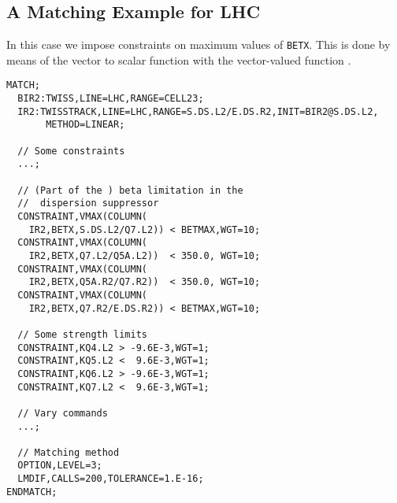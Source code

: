 \subsection{A Matching Example for LHC}
In this case we impose constraints on maximum values of \texttt{BETX}.
This is done by means of the vector to scalar function
 with the vector-valued function
.
\begin{verbatim}
MATCH;
  BIR2:TWISS,LINE=LHC,RANGE=CELL23;
  IR2:TWISSTRACK,LINE=LHC,RANGE=S.DS.L2/E.DS.R2,INIT=BIR2@S.DS.L2,
       METHOD=LINEAR;

  // Some constraints
  ...;

  // (Part of the ) beta limitation in the 
  //  dispersion suppressor
  CONSTRAINT,VMAX(COLUMN(
  	IR2,BETX,S.DS.L2/Q7.L2)) < BETMAX,WGT=10;
  CONSTRAINT,VMAX(COLUMN(
  	IR2,BETX,Q7.L2/Q5A.L2))  < 350.0, WGT=10;
  CONSTRAINT,VMAX(COLUMN(
  	IR2,BETX,Q5A.R2/Q7.R2))  < 350.0, WGT=10;
  CONSTRAINT,VMAX(COLUMN(
  	IR2,BETX,Q7.R2/E.DS.R2)) < BETMAX,WGT=10;

  // Some strength limits
  CONSTRAINT,KQ4.L2 > -9.6E-3,WGT=1;
  CONSTRAINT,KQ5.L2 <  9.6E-3,WGT=1;
  CONSTRAINT,KQ6.L2 > -9.6E-3,WGT=1;
  CONSTRAINT,KQ7.L2 <  9.6E-3,WGT=1;

  // Vary commands
  ...;

  // Matching method
  OPTION,LEVEL=3;
  LMDIF,CALLS=200,TOLERANCE=1.E-16;
ENDMATCH;
\end{verbatim}

